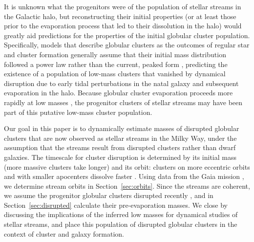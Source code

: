 \documentclass[twocolumn]{aastex63}
\begin{document}

It is unknown what the progenitors were of the population of stellar streams in the Galactic halo, but reconstructing their initial properties (or at least those prior to the evaporation process that led to their dissolution in the halo) would greatly aid predictions for the properties of the initial globular cluster population.
Specifically, models that describe globular clusters as the outcomes of regular star and cluster formation generally assume that their initial mass distribution followed a power law rather than the current, peaked form \citep{elmegreen:1997,fall:2001,elmegreen:2010,kruijssen15b}, predicting the existence of a population of low-mass clusters that vanished by dynamical disruption due to early tidal perturbations in the natal galaxy and subsequent evaporation in the halo.
Because globular cluster evaporation proceeds more rapidly at low masses \citep{baumgardt03}, the progenitor clusters of stellar streams may have been part of this putative low-mass cluster population.

Our goal in this paper is to dynamically estimate masses of disrupted globular clusters that are now observed as stellar streams in the Milky Way, under the assumption that the streams result from disrupted clusters rather than dwarf galaxies.
The timescale for cluster disruption is determined by its initial mass (more massive clusters take longer) and its orbit: clusters on more eccentric orbits and with smaller apocenters dissolve faster \citep{baumgardt03,kruijssen09}.
Using data from the Gaia mission \citep{gdr2}, we determine stream orbits in Section~\ref{sec:orbits}.
Since the streams are coherent, we assume the progenitor globular clusters disrupted recently \citep{helmi:2003}, and in Section~\ref{sec:disrupted} calculate their pre-evaporation masses.
We close by discussing the implications of the inferred low masses for dynamical studies of stellar streams, and place this population of disrupted globular clusters in the context of cluster and galaxy formation.
\end{document}
